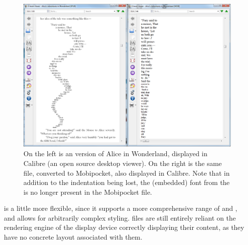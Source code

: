 \begin{figure}[tb]
\includegraphics[width=\textwidth]{gfx/alices1}
\caption[Document displayed in Calibre]{On the left is an \epub{} version of Alice in Wonderland, displayed in Calibre (an open source desktop \ebook{} viewer). On the right is the same file, converted to Mobipocket, also displayed in Calibre. Note that in addition to the indentation being lost, the (embedded) font from the \epub{} is no longer present in the Mobipocket file.}
\label{fig:alices1}
\end{figure}


\epub{} is a little more flexible, since it supports a more comprehensive range of \xhtml{} and \css{}, and allows for arbitrarily complex styling. \epub{} files are still entirely reliant on the rendering engine of the display device correctly displaying their content, as they have no concrete layout associated with them.

